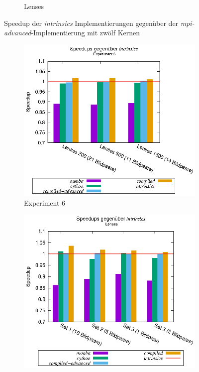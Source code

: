 \begin{center}
\begin{figure}[htbp]
\begin{subfigure}[b]{0.54\textwidth}
			\caption{Lenses}
			\label{fig:speedups_intrinsics_lenses}
		\end{subfigure}
		\caption{Speedup der \textit{intrinsics} Implementierungen gegenüber der \textit{mpi-advanced}-Implementierung mit zwölf Kernen}
		\label{fig:speedups_intrinsics}
	\end{figure}
\end{center}

\begin{center}
	\begin{figure}[htbp]
		\begin{subfigure}[b]{0.54\textwidth}
			\centering
			\includegraphics[width=\textwidth]{pdf/speedups_exp6}
			\caption{Experiment 6}
			\label{fig:speedups_exp6}
		\end{subfigure}
		\hspace{-0.9cm}
		\begin{subfigure}[b]{0.54\textwidth}
			\centering
			\includegraphics[width=\textwidth]{pdf/speedups_lenses}

\end{subfigure}
\end{figure}
\end{center}
